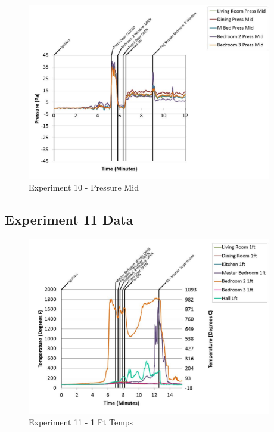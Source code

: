 \documentclass{article}
\begin{document}
\begin{appendices}
	\clearpage

	\begin{figure}[h!]
		\centering
		\includegraphics[height=3.05in]{0_Images/Results_Charts/Exp_10_Charts/PressureMid.pdf}
		\caption{Experiment 10 - Pressure Mid}
	\end{figure}
 

		\clearpage
\clearpage		\large
\subsection{Experiment 11 Data} \label{App:Exp11Results} 

	\begin{figure}[h!]
		\centering
		\includegraphics[height=3.05in]{0_Images/Results_Charts/Exp_11_Charts/1FtTemps.pdf}
		\caption{Experiment 11 - 1 Ft Temps}
	\end{figure}
 


\end{appendices}
\end{document}
